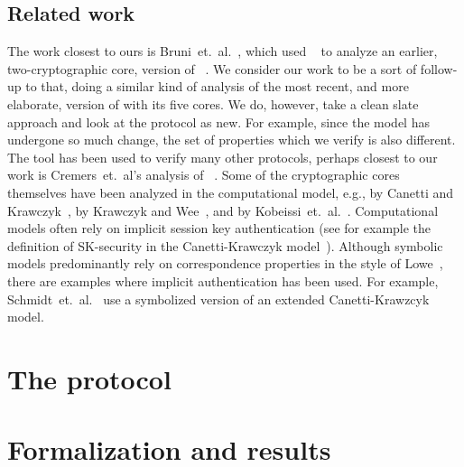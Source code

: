 \documentclass[runningheads, envcountsame, a4paper, draft, x11names]{llncs}
\newcommand{\spacehack}{\vspace{-1em}}
\newcommand{\fillhack}{\vspace{-0.5em}}
\begin{document}
\subsection{Related work}
\label{sec:relatedWork}
\fillhack
The work closest to ours is Bruni~et.~al.~\cite{DBLP:conf/secsr/BruniJPS18},
which used \mProverif~\cite{DBLP:conf/csfw/Blanchet01} to analyze an earlier,
two-cryptographic core, version of \mEdhoc~\cite{selander-ace-cose-ecdhe-08}.
%
We consider our work to be a sort of follow-up to that, doing a similar kind of
analysis of the most recent, and more elaborate, version of \mEdhoc{} with its
five cores.
%
We do, however, take a clean slate approach and look at the protocol as new.
%
For example, since the model has undergone so much change, the set of properties
which we verify is also different.
%
The \mTamarin{} tool has been used to verify many other protocols, perhaps
closest to our work is Cremers~et.~al's analysis of
\mTls~\cite{DBLP:conf/ccs/CremersHHSM17}.
%
Some of the cryptographic cores themselves have been analyzed in the
computational model, e.g., \mSigma{} by Canetti and
Krawczyk~\cite{DBLP:conf/crypto/CanettiK02}, \mOptls{} by Krawczyk and
Wee~\cite{DBLP:conf/eurosp/KrawczykW16}, and \mNoise{} by
Kobeissi~et.~al.~\cite{DBLP:conf/eurosp/KobeissiNB19}.
%
Computational models often rely on implicit session key authentication
(see for example the definition of SK-security in the Canetti-Krawczyk
model~\cite{DBLP:conf/crypto/CanettiK02}).
%
Although symbolic models predominantly rely on correspondence properties in the
style of Lowe~\cite{DBLP:conf/csfw/Lowe97a}, there are examples where implicit
authentication has been used.
%
For example, Schmidt~et.~al.~\cite{DBLP:conf/csfw/SchmidtMCB12} use a
symbolized version of an extended Canetti-Krawzcyk model.
%

\spacehack
\section{The \mEdhoc{} protocol}
\label{sec:edhoc}


\spacehack
\section{Formalization and results}
\label{sec:formalization}


\spacehack
\end{document}
